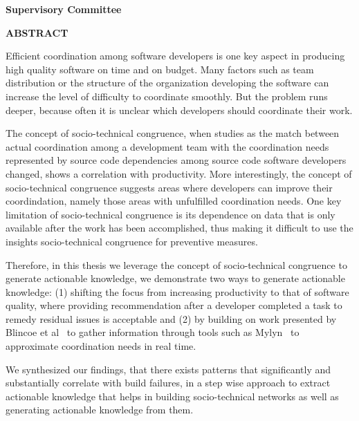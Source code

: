 \newpage
{}

\noindent \textbf{Supervisory Committee}
\tpbreak
\panel

\begin{center}
\textbf{ABSTRACT}
\end{center}
Efficient coordination among software developers is one key aspect in producing high quality software on time and on budget.
Many factors such as team distribution or the structure of the organization developing the software can increase the level of difficulty to coordinate smoothly.
But the problem runs deeper, because often it is unclear which developers should coordinate their work.

The concept of socio-technical congruence, when studies as the match between actual coordination among a development team with the coordination needs represented by source code dependencies among source code software developers changed, shows a correlation with productivity.%
More interestingly, the concept of socio-technical congruence suggests areas where developers can improve their coordindation, namely those areas with unfulfilled coordination needs.
One key limitation of socio-technical congruence is its dependence on data that is only available after the work has been accomplished, thus making it difficult to use the insights socio-technical congruence for preventive measures.

Therefore, in this thesis we leverage the concept of socio-technical congruence to generate actionable knowledge, we demonstrate two ways to generate actionable knowledge: (1) shifting the focus from increasing productivity to that of software quality, where providing recommendation after a developer completed a task to remedy residual issues is acceptable and (2) by building on work presented by Blincoe et al~\cite{blincoe:cscw:2012} to gather information through tools such as Mylyn~\cite{kersten:aosd:2005} to approximate coordination needs in real time.

We synthesized our findings, that there exists patterns that significantly and substantially correlate with build failures, in a step wise approach to extract actionable knowledge that helps in building socio-technical networks as well as generating actionable knowledge from them.
